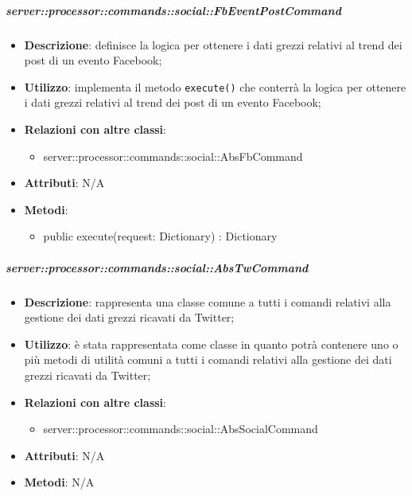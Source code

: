         \subparagraph{server::processor::commands::social::FbEventPostCommand} %
        \label{subp:bdsm_app_server_processor_commands_social_fbeventpostcommand}
        \begin{itemize}
          \item \textbf{Descrizione}: definisce la logica per ottenere i dati grezzi relativi al trend dei post di un evento Facebook;
          \item \textbf{Utilizzo}: implementa il metodo \texttt{execute()} che conterrà la logica per ottenere i dati grezzi relativi al trend dei post di un evento Facebook;
          \item \textbf{Relazioni con altre classi}:
            \begin{itemize}
              \item server::processor::commands::social::AbsFbCommand
            \end{itemize}
            \item \textbf{Attributi}: N/A
			\item \textbf{Metodi}:
        	\begin{itemize}
          		\item public execute(request: Dictionary) : Dictionary
        	\end{itemize}
        \end{itemize}


        \subparagraph{server::processor::commands::social::AbsTwCommand} %
        \label{subp:bdsm_app_server_processor_commands_social::abstwcommand}
        \begin{itemize}
          \item \textbf{Descrizione}: rappresenta una classe comune a tutti i comandi relativi alla gestione dei dati grezzi ricavati da Twitter;
          \item \textbf{Utilizzo}: è stata rappresentata come classe in quanto potrà contenere uno o più metodi di utilità comuni a tutti i comandi relativi alla gestione dei dati grezzi ricavati da Twitter;
          \item \textbf{Relazioni con altre classi}:
            \begin{itemize}
              \item server::processor::commands::social::AbsSocialCommand
            \end{itemize}
			\item \textbf{Attributi}: N/A
			\item \textbf{Metodi}: N/A
        \end{itemize}

